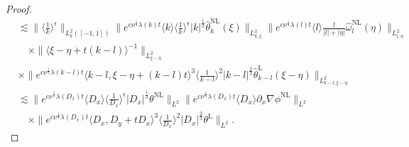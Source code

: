 \documentclass[reqno, 12pt]{amsart} %
\theoremstyle{plain} %
\theoremstyle{definition}
\theoremstyle{remark}
\numberwithin{equation}{section} %
\newcommand{\no}{\nonumber}
\begin{document}
\begin{proof}
\begin{align}
			& \lesssim\|\langle\frac{1}{k}\rangle^\epsilon\|_{L_k^2([-1,1])}\|e^{c \nu^{\frac{1}{3}} \lambda(k) t}\langle k\rangle\langle\frac{1}{k}\rangle^\epsilon |k|^\frac13  \hat{\theta}_k^{\mathrm{NL}}(\xi)\|_{L_{k, \xi}^2}\|e^{c \nu^{\frac{1}{3}} \lambda(l) t}\langle l\rangle \frac{l}{|l|+|\eta|} \hat{\omega}_l^{\mathrm{NL}}(\eta)\|_{L_{l, \eta}^2} \no\\
			& \quad \times\|\langle\xi-\eta+t(k-l)\rangle^{-1}\|_{L_{\xi-\eta}^2} \no\\
			& \times\|e^{c \nu^{\frac{1}{3}} \lambda(k-l) t}\langle k-l, \xi-\eta+(k-l) t\rangle^3\langle\frac{1}{k-l}\rangle^2|k-l|^{\frac{2}{3}} \hat{\theta}_{k-l}^{\mathrm{L}}(\xi-\eta)\|_{L_{k-l, \xi-\eta}^2} \no\\
			& \lesssim\|e^{c \nu^{\frac{1}{3}} \lambda\left(D_x\right) t}\langle D_x\rangle\langle\frac{1}{D_x}\rangle^\epsilon |D_x|^\frac13 \theta^{\mathrm{NL}}\|_{L^2}\|e^{c \nu^{\frac{1}{3}} \lambda\left(D_x\right) t}\langle D_x\rangle \partial_x \nabla \phi^{\mathrm{NL}}\|_{L^2} \no\\
			& \quad \times\|e^{c \nu^{\frac{1}{3}} \lambda\left(D_x\right) t}\langle D_x, D_y+t D_x\rangle^3\langle\frac{1}{D_x}\rangle^2\left|D_x\right|^{\frac{2}{3}} \theta^{\mathrm{L}}\|_{L^2}.
		\end{align}
		

\end{proof}
\end{document}
